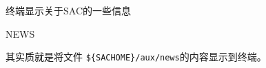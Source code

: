 \label{cmd:news}

终端显示关于SAC的一些信息

\begin{SACSTX}
NEWS
\end{SACSTX}

其实质就是将文件 \verb|${SACHOME}/aux/news|的内容显示到终端。